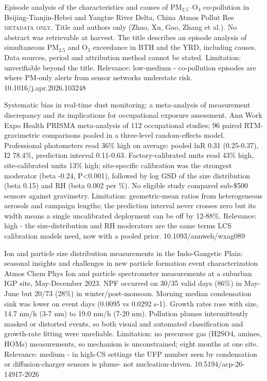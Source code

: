 \documentclass[10pt]{article}
\begin{document}
{Episode analysis of the characteristics and causes of PM$_{2.5}$–O$_3$ co-pollution in Beijing-Tianjin-Hebei and Yangtze River Delta, China}
{Atmos Pollut Res}
{\textsc{metadata only.} Title and authors only (Zhao, Xu, Gao, Zhang et al.). No abstract was retrievable at harvest. The title describes an episode analysis of simultaneous PM$_{2.5}$ and O$_3$ exceedance in BTH and the YRD, including causes. Data sources, period and attribution method cannot be stated. Limitation: unverifiable beyond the title. Relevance: low-medium - co-pollution episodes are where PM-only alerts from sensor networks understate risk.}
{10.1016/j.apr.2026.103248}

\par{}\baselineskip{}\baselineskip
{}

{Systematic bias in real-time dust monitoring: a meta-analysis of measurement discrepancy and its implications for occupational exposure assessment.}
{Ann Work Expo Health}
{PRISMA meta-analysis of 112 occupational studies; 96 paired RTM-gravimetric comparisons pooled in a three-level random-effects model. Professional photometers read 36\% high on average: pooled lnR 0.31 (0.25-0.37), I2 78.4\%, prediction interval 0.11-0.63. Factory-calibrated units read 43\% high, site-calibrated units 13\% high; site-specific calibration was the strongest moderator (beta -0.24, P<0.001), followed by log GSD of the size distribution (beta 0.15) and RH (beta 0.002 per \%). No eligible study compared sub-\$500 sensors against gravimetry. Limitation: geometric-mean ratios from heterogeneous aerosols and campaign lengths; the prediction interval never crosses zero but its width means a single uncalibrated deployment can be off by 12-88\%. Relevance: high - the size-distribution and RH moderators are the same terms LCS calibration models need, now with a pooled prior.}
{10.1093/annweh/wxag089}

{Ion and particle size distribution measurements in the Indo-Gangetic Plain: seasonal insights and challenges in new particle formation event characterization}
{Atmos Chem Phys}
{Ion and particle spectrometer measurements at a suburban IGP site, May-December 2023. NPF occurred on 30/35 valid days (86\%) in May-June but 20/73 (28\%) in winter/post-monsoon. Morning median condensation sink was lower on event days (0.0095 vs 0.0292 s-1). Growth rates rose with size, 14.7 nm/h (3-7 nm) to 19.0 nm/h (7-20 nm). Pollution plumes intermittently masked or distorted events, so both visual and automated classification and growth-rate fitting were unreliable. Limitation: no precursor gas (H2SO4, amines, HOMs) measurements, so mechanism is unconstrained; eight months at one site. Relevance: medium - in high-CS settings the UFP number seen by condensation or diffusion-charger sensors is plume- not nucleation-driven.}
{10.5194/acp-26-14917-2026}
\end{document}
